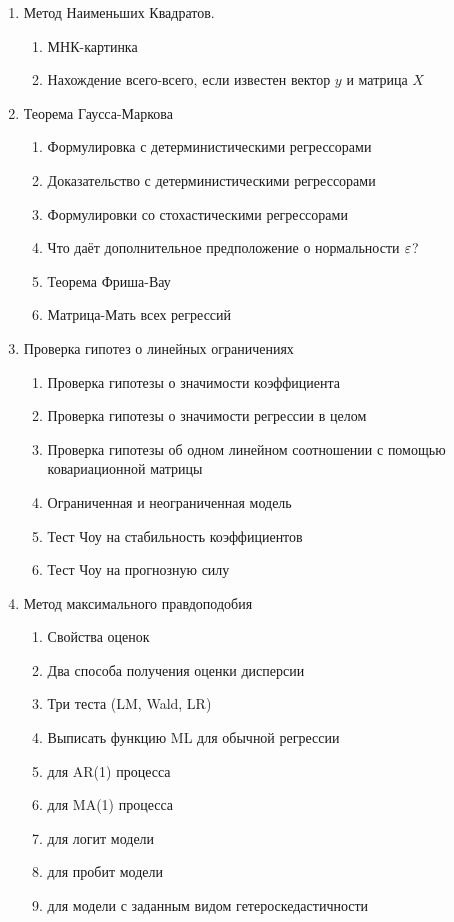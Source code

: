 \documentclass[12pt, a4paper]{article}
\theoremstyle{definition}
\begin{document}
\begin{enumerate}

\item Метод Наименьших Квадратов.

\begin{enumerate}
\item МНК-картинка
\item Нахождение всего-всего, если известен вектор $y$ и матрица $X$
  \end{enumerate}

\item Теорема Гаусса-Маркова
\begin{enumerate}
\item Формулировка с детерминистическими регрессорами
\item Доказательство с детерминистическими регрессорами
\item Формулировки со стохастическими регрессорами
\item Что даёт дополнительное предположение о нормальности $\varepsilon$?
\item Теорема Фриша-Вау
\item Матрица-Мать всех регрессий
\end{enumerate}

\item Проверка гипотез о линейных ограничениях
\begin{enumerate}
\item Проверка гипотезы о значимости коэффициента
\item Проверка гипотезы о значимости регрессии в целом
\item Проверка гипотезы об одном линейном соотношении с помощью ковариационной матрицы
\item Ограниченная и неограниченная модель
\item Тест Чоу на стабильность коэффициентов
\item Тест Чоу на прогнозную силу
\end{enumerate}

\item Метод максимального правдоподобия

\begin{enumerate}
\item Свойства оценок
\item Два способа получения оценки дисперсии
\item Три теста (LM, Wald, LR)
\item Выписать функцию ML для обычной регрессии
\item для AR(1) процесса
\item для MA(1) процесса
\item для логит модели
\item для пробит модели
\item для модели с заданным видом гетероскедастичности
\end{enumerate}


\end{enumerate}
\end{document}
